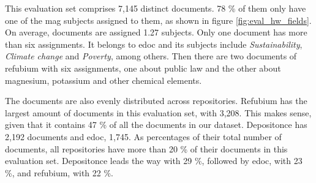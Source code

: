 This evaluation set comprises 7,145 distinct documents. 78 \% of them only have one of the \acrshort{mag} subjects assigned to them, as shown in figure \ref{fig:eval_hw_fields}. On average, documents are assigned 1.27 subjects. Only one document has more than six assignments. It belongs to edoc and its subjects include \textit{Sustainability}, \textit{Climate change} and \textit{Poverty}, among others. Then there are two documents of refubium with six assignments, one about public law and the other about magnesium, potassium and other chemical elements.

The documents are also evenly distributed across repositories. Refubium has the largest amount of documents in this evaluation set, with 3,208. This makes sense, given that it contains 47 \% of all the documents in our dataset. Depositonce has 2,192 documents and edoc, 1,745. As percentages of their total number of documents, all repositories have more than 20 \% of their documents in this evaluation set. Depositonce leads the way with 29 \%, followed by edoc, with 23 \%, and refubium, with 22 \%.

